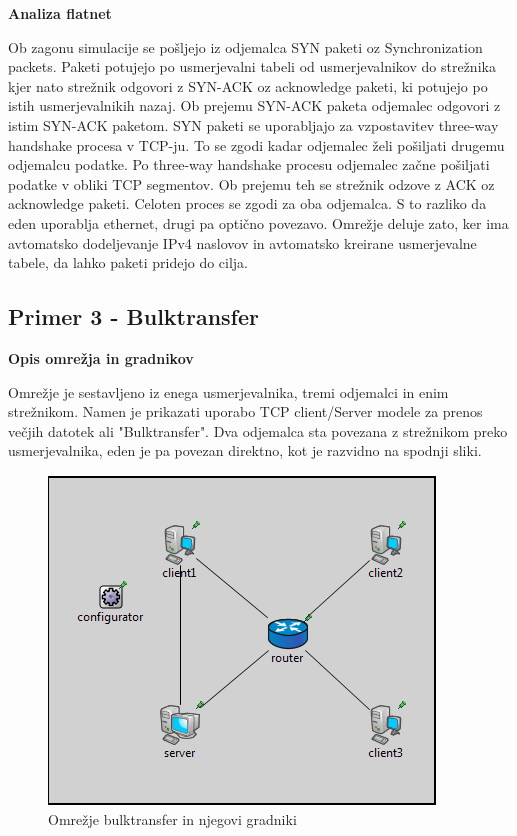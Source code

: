 \documentclass[11pt, a4paper, slovene]{book}
\begin{document}
\large\bf Analiza flatnet
\normalfont \normalsize 

Ob zagonu simulacije se pošljejo iz odjemalca SYN paketi oz Synchronization packets. Paketi potujejo po usmerjevalni tabeli od usmerjevalnikov do strežnika kjer nato strežnik odgovori z SYN-ACK oz acknowledge paketi, ki potujejo po istih usmerjevalnikih nazaj. Ob prejemu SYN-ACK paketa odjemalec odgovori z istim SYN-ACK paketom. SYN paketi se uporabljajo za vzpostavitev three-way handshake procesa v TCP-ju. To se zgodi kadar odjemalec želi pošiljati drugemu odjemalcu podatke. Po three-way handshake procesu odjemalec začne pošiljati podatke v obliki TCP segmentov. Ob prejemu teh se strežnik odzove z ACK oz acknowledge paketi. Celoten proces se zgodi za oba odjemalca. S to razliko da eden uporablja ethernet, drugi pa optično povezavo. Omrežje deluje zato, ker ima avtomatsko dodeljevanje IPv4 naslovov in avtomatsko kreirane usmerjevalne tabele, da lahko paketi pridejo do cilja.


\subsection{Primer 3 - Bulktransfer}
\large \bf Opis omrežja in gradnikov
\normalfont \normalsize 

Omrežje je sestavljeno iz enega usmerjevalnika, tremi odjemalci in enim strežnikom. Namen je prikazati uporabo TCP client/Server modele za prenos večjih datotek ali "Bulktransfer". Dva odjemalca sta povezana z strežnikom preko usmerjevalnika, eden je pa povezan direktno, kot je razvidno na spodnji sliki.
\begin{figure}[h]
	\centering
	\includegraphics[width=\textwidth]{BulkTransfer.png}
	\caption{Omrežje bulktransfer in njegovi gradniki}
	\label{bulkTransfer}	
\end{figure}
\end{document}
